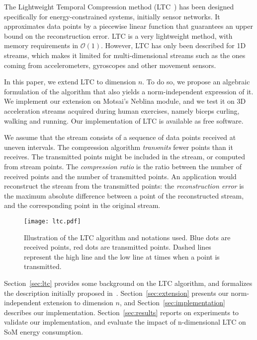 \documentclass[10pt, conference, compsocconf]{IEEEtran}
\begin{document}

The Lightweight Temporal Compression method 
(LTC~\cite{schoellhammer2004lightweight}) has been designed 
specifically for energy-constrained systems, initially sensor networks. 
It approximates data points by a piecewise linear function that 
guarantees an upper bound on the reconstruction error. LTC is a very 
lightweight method, with memory requirements in $\mathcal{O}(1)$. 
However, LTC has only been described for 1D streams, which makes it 
limited for multi-dimensional streams such as the ones coming from 
accelerometers, gyroscopes and other movement sensors.

In this paper, we extend LTC to dimension $n$. To do so, we propose an 
algebraic formulation of the algorithm that also yields a 
norm-independent expression of it. We implement our extension on 
Motsai's Neblina module, and we test it on 3D acceleration streams 
acquired during human exercises, namely biceps curling, walking and 
running. Our implementation of LTC is available as free software.

We assume that the stream consists of a sequence of data points 
received at uneven intervals. The compression algorithm 
\emph{transmits} fewer points than it receives. The transmitted points 
might be included in the stream, or computed from stream points. The 
\emph{compression ratio} is the ratio between the number of received 
points and the number of transmitted points. An application would 
reconstruct the stream from the transmitted points: the 
\emph{reconstruction error} is the maximum absolute difference between 
a point of the reconstructed stream, and the corresponding 
point in the original stream.

\begin{figure}
\texttt{[image: ltc.pdf]}
\caption{Illustration of the LTC algorithm and notations used. Blue 
dots are received points, red dots are transmitted points. Dashed lines 
represent the high line and the low line at times when a point is 
transmitted.\vspace*{-0.3cm}}
\label{fig:ltc}
\end{figure}

Section~\ref{sec:ltc} provides some background on the LTC algorithm, 
and formalizes the description initially proposed 
in~\cite{schoellhammer2004lightweight}. Section~\ref{sec:extension} 
presents our norm-independent extension to dimension $n$, and 
Section~\ref{sec:implementation} describes our implementation. 
Section~\ref{sec:results} reports on experiments to validate our 
implementation, and evaluate the impact of n-dimensional LTC on SoM 
energy consumption.
\end{document}
